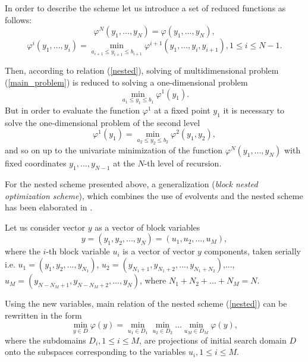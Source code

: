 \documentclass[runningheads]{llncs}
\begin{document}
In order to describe the scheme let us introduce a set of reduced functions 
as follows:
\begin{equation}\label{nested_N}
\varphi^N(y_1,...,y_N) = \varphi(y_1,...,y_N),
\end{equation}
\begin{equation}\label{nested_i}
\varphi^i(y_1,...,y_i) = \min_{a_{i+1}\leq y_{i+1}\leq b_{i+1}} \varphi^{i+1}(
y_1,...,y_i,y_{i+1}), 1\leq i\leq N-1.
\end{equation}

Then, according to relation (\ref{nested}), solving of multidimensional 
problem (\ref{main_problem}) is reduced to solving a one-dimensional problem 
\begin{equation}\label{nested_1}
\min_{a_1\leq y_1\leq b_1}\varphi^1(y_1).
\end{equation}
But in order to evaluate the function $\varphi^1$ at a fixed point $y_1$ it 
is necessary to solve the one-dimensional problem of the second level
\begin{equation}
\varphi^1(y_1) = \min_{a_2\leq y_2\leq b_2}\varphi^2(y_1,y_2),
\end{equation}
and so on up to the univariate minimization of the function $\varphi^N(y_1
,...,y_N)$ with fixed coordinates $y_1,...,y_{N-1}$ at the $N$-th level of 
recursion.

For the nested scheme presented above, a generalization (\textit{block nested 
optimization scheme}), which combines the use of evolvents and the nested 
scheme has been elaborated in \cite{Barkalov2016}.

Let us consider vector $y$ as a vector of block variables
\begin{equation}
y=(y_1,y_2,...,y_N)=(u_1,u_2,...,u_M),
\end{equation}
where the $i$-th block variable $u_i$ is a vector of vector $y$ components, 
taken serially i.e. $u_1=(y_1,y_2,...,y_{N_1})$, $u_2=(y_{N_1+1},y_{N_1+2}
,...,y_{N_1+N_2})$,..., $u_M=(y_{N-N_M+1},y_{N-N_M+2},...,y_{N})$, where $N_1+
N_2+...+N_M=N$.

Using the new variables, main relation of the nested scheme (\ref{nested}) 
can be rewritten in the form 
\begin{equation}\label{block_nested}
\min_{y \in D}\varphi(y) = \min_{u_1\in D_1}\min_{u_2\in D_2}...\min_{u_M \in 
D_M}\varphi(y),
\end{equation}
where the subdomains $D_i, 1 \leq i \leq M$, are projections of initial 
search domain $D$ onto the subspaces corresponding to the variables $u_i, 1 
\leq i \leq M$.
\end{document}

